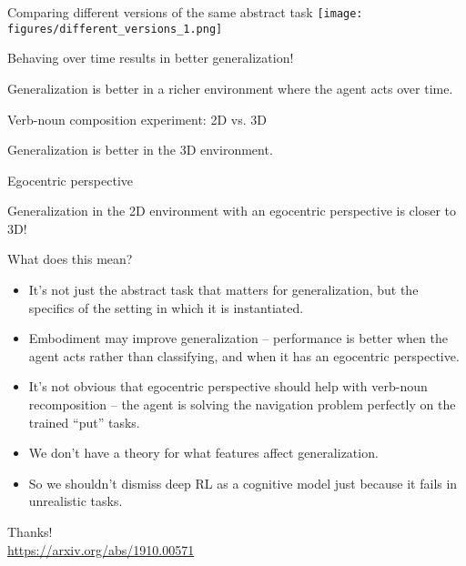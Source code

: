 \documentclass{beamer}
\begin{document}
\begin{frame}{Comparing different versions of the same abstract task}
\centering
\texttt{[image: figures/different\_versions\_1.png]}
\end{frame}

\begin{frame}{Behaving over time results in better generalization!}

\end{frame}

\begin{frame}[standout]
Generalization is better in a richer environment where the agent acts over time.
\end{frame}

\begin{frame}{Verb-noun composition experiment: 2D vs. 3D}

\end{frame}

\begin{frame}[standout]
Generalization is better in the 3D environment.
\end{frame}

\begin{frame}{Egocentric perspective}

\end{frame}

\begin{frame}[standout]
Generalization in the 2D environment with an egocentric perspective is closer to 3D!
\end{frame}

\begin{frame}{What does this mean?}
\begin{itemize}
\item It's not just the abstract task that matters for generalization, but the specifics of the setting in which it is instantiated. 
\item Embodiment may improve generalization -- performance is better when the agent acts rather than classifying, and when it has an egocentric perspective.
\item It's not obvious that egocentric perspective should help with verb-noun recomposition -- the agent is solving the navigation problem perfectly on the trained ``put'' tasks.
\item We don't have a theory for what features affect generalization.
\item So we shouldn't dismiss deep RL as a cognitive model just because it fails in unrealistic tasks. 
\end{itemize}
\end{frame}

\begin{frame}[standout]
Thanks!\\
\url{https://arxiv.org/abs/1910.00571}
\end{frame}
\end{document}
